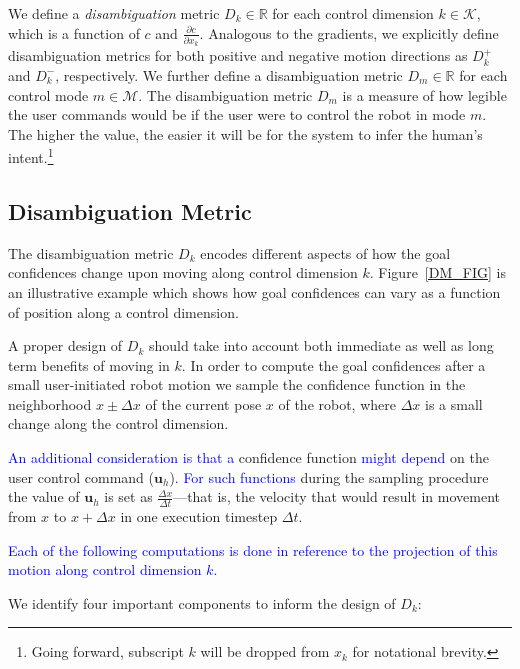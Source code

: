 \documentclass[conference]{IEEEtran}
\begin{document}
We define a \textit{disambiguation} metric $D_{k}\in \mathbb{R}$ for each control dimension $k \in \mathcal{K}$, which is a function of $c$ and $\frac{\partial c}{\partial x_k}$. Analogous to the gradients, we explicitly define disambiguation metrics for both positive and negative motion directions as $D_{k}^{+}$ and $D_{k}^{-}$, respectively.
We further define a disambiguation metric $D_m \in \mathbb{R}$ for each control mode $m \in \mathcal{M}$.
The disambiguation metric $D_m$ is a measure of how legible the user commands would be if the user were to control the robot in mode $m$. The higher the value, the easier it will be for the system to infer the human's intent.\footnote{Going forward, subscript $k$ will be dropped from $x_k$ for notational brevity.} 

\subsection{Disambiguation Metric}\label{DM}

The disambiguation metric $D_{k}$ encodes different aspects of how the goal confidences change upon moving along control dimension $k$. Figure~\ref{DM_FIG} is an illustrative example which shows how goal confidences can vary as a function of position along a control dimension. 

A proper design of $D_{k}$ should take into account both immediate as well as long term benefits of moving in $k$. In order to compute the goal confidences after a small user-initiated robot motion we sample the confidence function in the neighborhood $x\pm\Delta x$ of the current pose $x$ of the robot, where $\Delta x$ is a small change along the control dimension. 
	
\textcolor{blue}{An additional consideration is that a} confidence function \textcolor{blue}{might depend} on the user control command ($\boldsymbol{u}_h$). \textcolor{blue}{For such functions} during the sampling procedure the value of $\boldsymbol{u}_h$ is set as $\frac{\Delta x}{\Delta t}$---that is, the velocity that would result in movement from $x$ to $x + \Delta x$ in one execution timestep $\Delta t$. 

\textcolor{blue}{Each of the following computations is done in reference to the projection of this motion along control dimension $k$.}

We identify four important components to inform the design of $D_{k}$:
 
\end{document}
